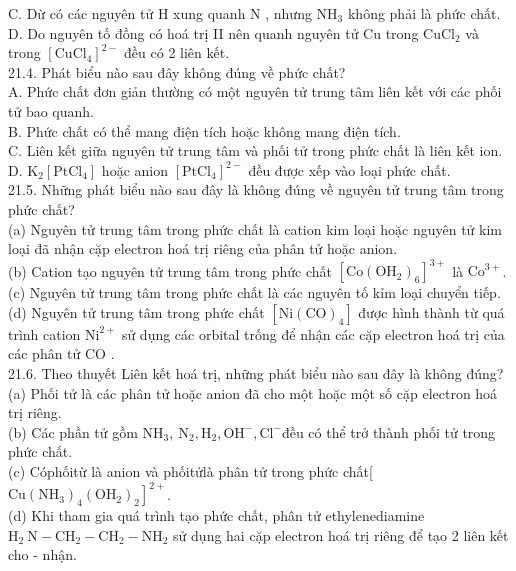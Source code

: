\documentclass[10pt]{article}
\begin{document}
C. Dừ có các nguyên tử H xung quanh N , nhưng $\mathrm{NH}_{3}$ không phải là phức chất.\\
D. Do nguyên tố đồng có hoá trị II nên quanh nguyên tử Cu trong $\mathrm{CuCl}_{2}$ và trong $\left[\mathrm{CuCl}_{4}\right]^{2-}$ đều có 2 liên kết.\\
21.4. Phát biểu nào sau đây không đúng về phức chất?\\
A. Phức chất đơn giản thường có một nguyên tử trung tâm liên kết với các phối tử bao quanh.\\
B. Phức chất có thể mang điện tích hoặc không mang điện tích.\\
C. Liên kết giữa nguyên tử trung tâm và phối tử trong phức chất là liên kết ion.\\
D. $\mathrm{K}_{2}\left[\mathrm{PtCl}_{4}\right]$ hoặc anion $\left[\mathrm{PtCl}_{4}\right]^{2-}$ đều được xếp vào loại phức chất.\\
21.5. Những phát biểu nào sau đây là không đúng về nguyên tử trung tâm trong phức chất?\\
(a) Nguyên tử trung tâm trong phức chất là cation kim loại hoặc nguyên tử kim loại đã nhận cặp electron hoá trị riêng của phân tử hoặc anion.\\
(b) Cation tạo nguyên tử trung tâm trong phức chất $\left[\mathrm{Co}\left(\mathrm{OH}_{2}\right)_{6}\right]^{3+}$ là $\mathrm{Co}^{3+}$.\\
(c) Nguyên tử trung tâm trong phức chất là các nguyên tố kỉm loại chuyển tiếp.\\
(d) Nguyên tử trung tâm trong phức chất $\left[\mathrm{Ni}(\mathrm{CO})_{4}\right]$ được hình thành từ quá trình cation $\mathrm{Ni}^{2+}$ sử dụng các orbital trống để nhận các cặp electron hoá trị của các phân tử CO .\\
21.6. Theo thuyết Liên kết hoá trị, những phát biểu nào sau đây là không đúng?\\
(a) Phối tử là các phân tử hoặc anion đã cho một hoặc một số cặp electron hoá trị riêng.\\
(b) Các phần tử gồm $\mathrm{NH}_{3}, \mathrm{~N}_{2}, \mathrm{H}_{2}, \mathrm{OH}^{-}, \mathrm{Cl}^{-}$đều có thể trở thành phối tử trong phức chất.\\
(c) Cóphốitừ là anion và phốitửlà phân tử trong phức chất[ $\left.\mathrm{Cu}\left(\mathrm{NH}_{3}\right)_{4}\left(\mathrm{OH}_{2}\right)_{2}\right]^{2+}$.\\
(d) Khi tham gia quá trình tạo phức chất, phân tử ethylenediamine $\mathrm{H}_{2} \mathrm{~N}-\mathrm{CH}_{2}-\mathrm{CH}_{2}-\mathrm{NH}_{2}$ sử dụng hai cặp electron hoá trị riêng để tạo 2 liên kết cho - nhận.\\
\end{document}
